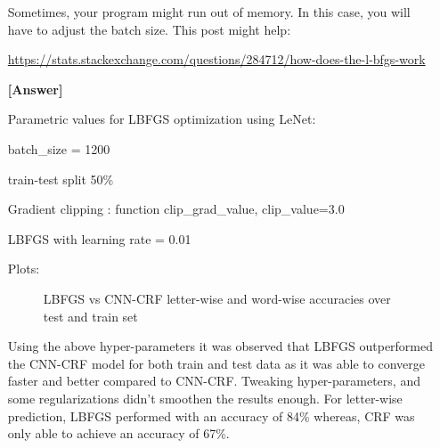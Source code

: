 \documentclass[11pt]{report}
\begin{document}
\begin{itemize}
  Sometimes, your program might run out of memory. In this case, you will have to adjust the batch size.  This post might help:
  
  \url{https://stats.stackexchange.com/questions/284712/how-does-the-l-bfgs-work}
  
 
\item[\textbf{[Answer]} ]{
Parametric values for LBFGS optimization using LeNet: 

batch\_size = 1200

train-test split 50\%

Gradient clipping : function clip\_grad\_value, clip\_value=3.0

LBFGS with learning rate = 0.01


Plots:
            \begin{figure}[H]
            	\centering
                \caption{LBFGS vs CNN-CRF letter-wise and word-wise accuracies over test and train set }
            	\label{fig:compare_optimizer}
            \end{figure}
    

Using the above hyper-parameters it was observed that LBFGS outperformed the CNN-CRF model for both train and test data as it was able to converge faster and better compared to CNN-CRF. Tweaking hyper-parameters, and some regularizations didn’t smoothen the results
enough. For letter-wise prediction, LBFGS performed with an accuracy of 84\% whereas, CRF was only able to achieve an accuracy of 67\%. 

}
\end{itemize}
\end{document}

